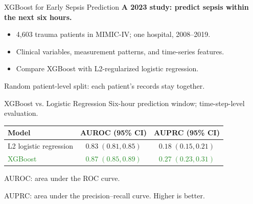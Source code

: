 \begin{frame}{XGBoost for Early Sepsis Prediction}
  \textbf{A 2023 study: predict sepsis within the next six hours.}
  \vspace{.3cm}
  \begin{itemize}\spaceditems
    \item 4,603 trauma patients in MIMIC-IV; one hospital, 2008--2019.
    \item Clinical variables, measurement patterns, and time-series features.
    \item Compare XGBoost with L2-regularized logistic regression.
  \end{itemize}
  \vspace{.25cm}
  \centering
  \vspace{.3cm}
  \par Random patient-level split: each patient's records stay together.
\end{frame}

\begin{frame}{XGBoost vs. Logistic Regression}
  \centering
  Six-hour prediction window; time-step-level evaluation.
  \vspace{.25cm}
  \renewcommand{\arraystretch}{1.3}
  \begin{tabular}{lcc}
    \toprule
    Model & AUROC (95\% CI) & AUPRC (95\% CI)\\ \midrule
    L2 logistic regression & $0.83\;(0.81,0.85)$ & $0.18\;(0.15,0.21)$\\
    \textcolor{forestgreen}{XGBoost} & \textcolor{forestgreen}{$0.87\;(0.85,0.89)$} & \textcolor{forestgreen}{$0.27\;(0.23,0.31)$}\\ \bottomrule
  \end{tabular}
  \vspace{.35cm}
  \par AUROC: area under the ROC curve.\par
  AUPRC: area under the precision--recall curve. Higher is better.
\end{frame}



